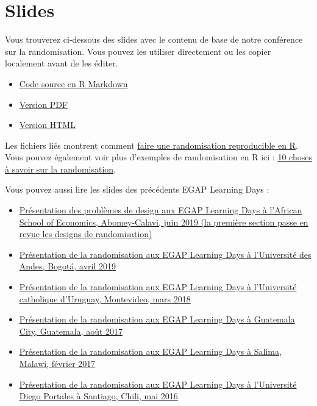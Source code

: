 \documentclass[
  12pt,
]{book}
\begin{document}
\hypertarget{slides-2}{%
\section{Slides}\label{slides-2}}

Vous trouverez ci-dessous des slides avec le contenu de base de notre conférence sur la randomisation. Vous pouvez les utiliser directement ou les copier localement avant de les éditer.

\begin{itemize}
\item
  \href{https://egap.github.io/learningdays-resources/Slides/randomization-slides.Rmd}{Code source en R Markdown}
\item
  \href{https://egap.github.io/learningdays-resources/Slides/randomization-slides.pdf}{Version PDF}
\item
  \href{https://egap.github.io/learningdays-resources/Slides/randomization-slides.html}{Version HTML}
\end{itemize}

Les fichiers liés montrent comment \href{https://egap.github.io/learningdays-resources/Exercises/randomization-exercises.Rmd}{faire une randomisation reproducible en R}.
Vous pouvez également voir plus d'exemples de randomisation en R ici : \href{https://egap.org/resource/10-things-to-know-about-randomization/}{10 choses à savoir sur la randomisation}.

Vous pouvez aussi lire les slides des précédents EGAP Learning Days :

\begin{itemize}
\item
  \href{https://egap.github.io/learningdays-resources/Slides/Examples/threats-benin.pdf}{Présentation des problèmes de design aux EGAP Learning Days à l'African School of Economics, Abomey-Calavi, juin 2019 (la première section passe en revue les designs de randomisation)}
\item
  \href{https://egap.github.io/learningdays-resources/Slides/Examples/randomization-bogota.pdf}{Présentation de la randomisation aux EGAP Learning Days à l'Université des Andes, Bogotá, avril 2019}
\item
  \href{https://egap.github.io/learningdays-resources/Slides/Examples/randomization-montevideo.pdf}{Présentation de la randomisation aux EGAP Learning Days à l'Université catholique d'Uruguay, Montevideo, mars 2018}
\item
  \href{https://egap.github.io/learningdays-resources/Slides/Examples/randomization-guatemala.pdf}{Présentation de la randomisation aux EGAP Learning Days à Guatemala City, Guatemala, août 2017}
\item
  \href{https://egap.github.io/learningdays-resources/Slides/Examples/randomization-malawi.pdf}{Présentation de la randomisation aux EGAP Learning Days à Salima, Malawi, février 2017}
\item
  \href{https://egap.github.io/learningdays-resources/Slides/Examples/randomization-santiago.pdf}{Présentation de la randomisation aux EGAP Learning Days à l'Université Diego Portales à Santiago, Chili, mai 2016}
\end{itemize}
\end{document}
